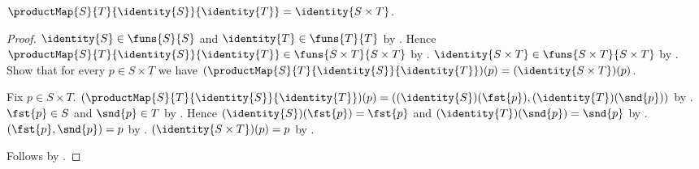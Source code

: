 \begin{theorem}\label{identity_product_map}
    $\productMap{S}{T}{\identity{S}}{\identity{T}}
        =\identity{S\times T}$.
\end{theorem}
\begin{proof}
    $\identity{S}\in\funs{S}{S}$ and
        $\identity{T}\in\funs{T}{T}$ by .
    Hence $\productMap{S}{T}{\identity{S}}{\identity{T}}
        \in\funs{S\times T}{S\times T}$ by .
    $\identity{S\times T}\in\funs{S\times T}{S\times T}$ by
        .
    Show that for every $p\in S\times T$ we have
        $(\productMap{S}{T}{\identity{S}}{\identity{T}})(p)
        =(\identity{S\times T})(p)$.
    \begin{subproof}
        Fix $p\in S\times T$.
        $(\productMap{S}{T}{\identity{S}}{\identity{T}})(p)
            =((\identity{S})(\fst{p}),(\identity{T})(\snd{p}))$ by
            .
        $\fst{p}\in S$ and $\snd{p}\in T$ by .
        Hence $(\identity{S})(\fst{p})=\fst{p}$ and
            $(\identity{T})(\snd{p})=\snd{p}$ by .
        $(\fst{p},\snd{p})=p$ by
            .
        $(\identity{S\times T})(p)=p$ by .
    \end{subproof}
    Follows by .
\end{proof}

